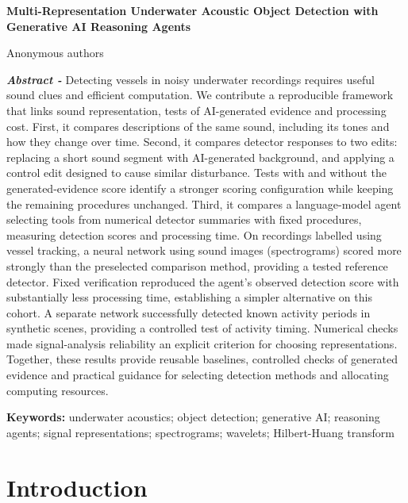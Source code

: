 \documentclass[11pt,letterpaper]{article}
\newcommand{\drafttitle}[1]{\begin{center}\sffamily\bfseries\fontsize{16}{19}\selectfont #1\end{center}}
\begin{document}
\fontsize{11}{13}\selectfont

\nocite{portia,signals1,signals2,uabench,physicsgen,huang1998,flowmatching,qwen,waveletship,uniqueship,speechocean,wav2vec2}

\drafttitle{Multi-Representation Underwater Acoustic Object Detection with Generative AI Reasoning Agents}

\begin{center}Anonymous authors\end{center}

{\fontsize{10}{11.5}\selectfont\noindent \textbf{\textit{Abstract - }}Detecting vessels in noisy underwater recordings requires useful sound clues and efficient computation. We contribute a reproducible framework that links sound representation, tests of AI-generated evidence and processing cost. First, it compares descriptions of the same sound, including its tones and how they change over time. Second, it compares detector responses to two edits: replacing a short sound segment with AI-generated background, and applying a control edit designed to cause similar disturbance. Tests with and without the generated-evidence score identify a stronger scoring configuration while keeping the remaining procedures unchanged. Third, it compares a language-model agent selecting tools from numerical detector summaries with fixed procedures, measuring detection scores and processing time. On recordings labelled using vessel tracking, a neural network using sound images (spectrograms) scored more strongly than the preselected comparison method, providing a tested reference detector. Fixed verification reproduced the agent's observed detection score with substantially less processing time, establishing a simpler alternative on this cohort. A separate network successfully detected known activity periods in synthetic scenes, providing a controlled test of activity timing. Numerical checks made signal-analysis reliability an explicit criterion for choosing representations. Together, these results provide reusable baselines, controlled checks of generated evidence and practical guidance for selecting detection methods and allocating computing resources.\par}

{\fontsize{9}{11}\selectfont\noindent \textbf{Keywords:} underwater acoustics; object detection; generative AI; reasoning agents; signal representations; spectrograms; wavelets; Hilbert-Huang transform\par}

\section{Introduction}
\end{document}
